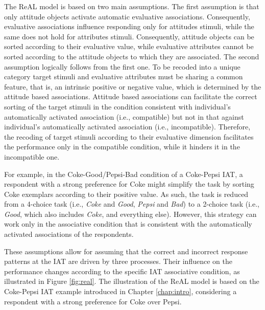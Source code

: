 \documentclass[12pt]{book}
\begin{document}
The ReAL model is based on two main assumptions. 
The first assumption is that only attitude objects activate automatic evaluative associations. Consequently, evaluative associations influence responding only for attitudes stimuli, while the same does not hold for attributes stimuli. Consequently, attitude objects can be sorted according to their evaluative value, while evaluative attributes cannot be sorted according to the attitude objects to which they are associated.
The second assumption logically follows from the first one. To be recoded into a unique category target stimuli and evaluative attributes must be sharing a common feature, that is, an intrinsic positive or negative value, which is determined by the attitude based associations.
Attitude based associations can facilitate the correct sorting of the target stimuli in the condition consistent with individual's automatically activated association (i.e., compatible) but not in that against individual's  automatically activated association (i.e., incompatible). Therefore, the recoding of target stimuli according to their evaluative dimension facilitates the performance only in the compatible condition, while it hinders it in the incompatible one.

For example, in the Coke-Good/Pepsi-Bad condition of a Coke-Pepsi IAT, a respondent with a strong preference for Coke might simplify the task by sorting Coke exemplars according to their positive value. 
As such, the task is reduced from a 4-choice task (i.e., \emph{Coke} and \emph{Good}, \emph{Pepsi} and \emph{Bad}) to a 2-choice task (i.e., \emph{Good}, which also includes \emph{Coke}, and everything else). However, this strategy can work only in the associative condition that is consistent with the automatically activated associations of the respondents.

These assumptions allow for assuming that the correct and incorrect response patterns at the IAT are driven by three processes. Their influence on the performance changes according to the specific IAT associative condition, as illustrated in Figure \ref{fig:real}. The illustration of the ReAL model is based on the Coke-Pepsi IAT example introduced in Chapter \ref{chap:intro}, considering a respondent with a strong preference for Coke over Pepsi.
\end{document}

